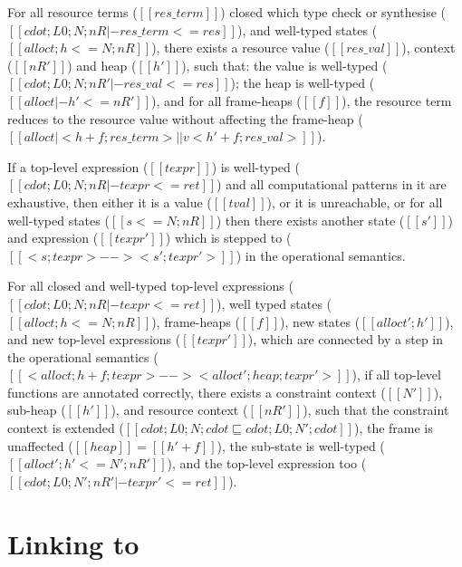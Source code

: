 \begin{theorem}
For all resource terms ($[[ res\_term ]]$) closed which type check or synthesise
($[[ cdot ; L0 ; N ; nR |- res\_term <= res ]]$), and well-typed states
($[[ alloct ; h <= N ; nR ]]$), there exists a resource value ($[[ res\_val ]]$),
context ($[[ nR' ]]$) and heap ($[[ h' ]]$), such that: the value is well-typed
($[[ cdot ; L0 ; N ; nR' |- res\_val <= res ]]$); the heap is well-typed
($[[ alloct |- h' <= nR' ]]$), and for all frame-heaps ($[[ f ]]$), the resource term
reduces to the resource value without affecting the frame-heap
($[[ alloct | < h + f ; res\_term > ||v < h' + f ; res\_val > ]]$).
\end{theorem}

\begin{theorem}
If a top-level expression ($[[ texpr ]]$) is well-typed
($[[ cdot ; L0 ; N ; nR |- texpr <= ret ]]$) and all computational patterns
in it are exhaustive, then either it is a value ($[[ tval ]]$), or it is
unreachable, or for all well-typed states ($[[ s <= N ; nR ]]$)
then there exists another state ($[[ s' ]]$) and expression ($[[ texpr' ]]$)
which is stepped to ($[[ < s ; texpr > --> < s' ; texpr' > ]]$)
in the operational semantics.
\end{theorem}

\begin{theorem}
For all closed and well-typed top-level expressions
($[[ cdot ; L0 ; N ; nR |- texpr <= ret ]]$),
well typed states ($[[ alloct ; h <= N ; nR ]]$),
frame-heaps ($[[ f ]]$),
new states ($[[ alloct' ; h' ]]$),
and new top-level expressions ($[[ texpr' ]]$),
which are connected by a step in the operational semantics
($[[ < alloct ; h + f ; texpr > -->  < alloct' ; heap ; texpr' > ]]$),
if all top-level functions are annotated correctly,
there exists a constraint context ($[[ N' ]]$),
sub-heap ($[[ h' ]]$),
and resource context ($[[ nR' ]]$),
such that the constraint context is extended
($[[ cdot ; L0 ; N ; cdot \sqsubseteq cdot ; L0 ; N' ; cdot ]]$),
the frame is unaffected ($[[ heap ]] = [[ h' + f ]]$),
the sub-state is well-typed ($[[ alloct' ; h' <= N' ; nR' ]]$),
and the top-level expression too
($[[ cdot ; L0 ; N' ; nR' |- texpr' <= ret ]]$).
\end{theorem}

\section{Linking  to }\label{sec:linking}

